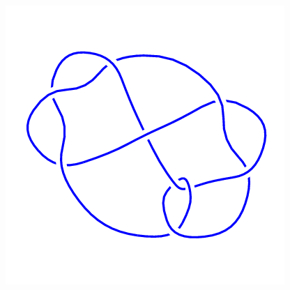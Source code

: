 \begin{figure}[H]
\begin{minipage}[b]{.18\linewidth}
    \end{minipage}
    \begin{minipage}[b]{.18\linewidth}
        \centering
        \includegraphics[width=\linewidth]{../data/9_20.png}
    \end{minipage}
\end{figure}
